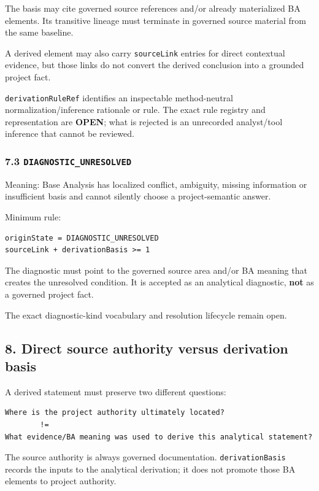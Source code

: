 \documentclass[11pt,a4paper]{article}
\begin{document}
The basis may cite governed source references and/or already materialized BA elements. Its transitive lineage must terminate in governed source material from the same baseline.

A derived element may also carry \texttt{sourceLink} entries for direct contextual evidence, but those links do not convert the derived conclusion into a grounded project fact.

\texttt{derivationRuleRef} identifies an inspectable method-neutral normalization/inference rationale or rule. The exact rule registry and representation are \textbf{OPEN}; what is rejected is an unrecorded analyst/tool inference that cannot be reviewed.

\subsubsection{\texorpdfstring{7.3 \texttt{DIAGNOSTIC\_UNRESOLVED}}{7.3 DIAGNOSTIC\_UNRESOLVED}}\label{73-diagnostic_unresolved}

Meaning: Base Analysis has localized conflict, ambiguity, missing information or insufficient basis and cannot silently choose a project-semantic answer.

Minimum rule:

\begin{verbatim}
originState = DIAGNOSTIC_UNRESOLVED
sourceLink + derivationBasis >= 1
\end{verbatim}

The diagnostic must point to the governed source area and/or BA meaning that creates the unresolved condition. It is accepted as an analytical diagnostic, \textbf{not} as a governed project fact.

The exact diagnostic-kind vocabulary and resolution lifecycle remain open.

\subsection{8. Direct source authority versus derivation basis}\label{8-direct-source-authority-versus-derivation-basis}

A derived statement must preserve two different questions:

\begin{verbatim}
Where is the project authority ultimately located?
        !=
What evidence/BA meaning was used to derive this analytical statement?
\end{verbatim}

The source authority is always governed documentation. \texttt{derivationBasis} records the inputs to the analytical derivation; it does not promote those BA elements to project authority.
\end{document}
